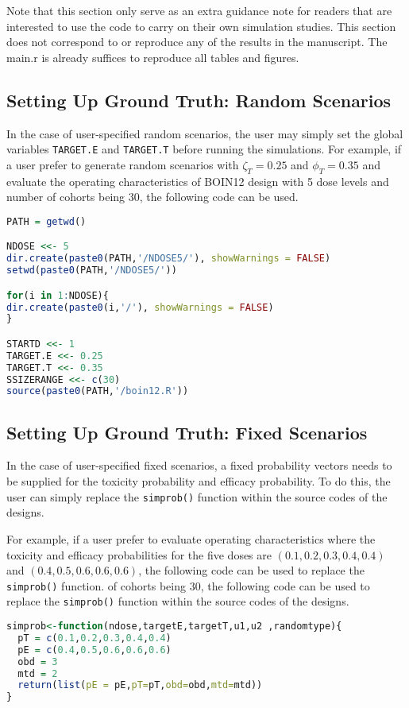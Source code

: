 \documentclass[notitlepage]{article}
\begin{document}
 Note that this section only serve as an extra guidance note for readers that are interested to use the code to carry on their own simulation studies. This section does not correspond to or reproduce any of the results in the manuscript. The main.r is already suffices to reproduce all tables and figures.

 \subsection{Setting Up Ground Truth: Random Scenarios}
 In the case of user-specified random scenarios, the user may simply set the global variables \texttt{TARGET.E} and  \texttt{TARGET.T} before running the simulations.
 For example, if a user prefer to generate random scenarios with $\zeta_T = 0.25$ and $\phi_T = 0.35$ and evaluate the operating characteristics of BOIN12 design with 5 dose levels and number of cohorts being 30, the following code can be used.
 \begin{lstlisting}[language=R]
PATH = getwd()

NDOSE <<- 5
dir.create(paste0(PATH,'/NDOSE5/'), showWarnings = FALSE)
setwd(paste0(PATH,'/NDOSE5/'))

for(i in 1:NDOSE){
dir.create(paste0(i,'/'), showWarnings = FALSE)
}

STARTD <<- 1
TARGET.E <<- 0.25
TARGET.T <<- 0.35
SSIZERANGE <<- c(30)
source(paste0(PATH,'/boin12.R'))
\end{lstlisting}

 \subsection{Setting Up Ground Truth: Fixed Scenarios}
 In the case of user-specified fixed scenarios, a fixed probability vectors needs to be supplied for the toxicity probability and efficacy probability. To do this, the user can simply replace the \texttt{simprob()} function within the source codes of the designs.

 For example, if a user prefer to evaluate operating characteristics  where the toxicity and efficacy probabilities for the five doses are $(0.1,0.2,0.3,0.4,0.4)$ and $(0.4,0.5,0.6,0.6,0.6)$, the following code can be used to replace the \texttt{simprob()} function.
 of cohorts being 30, the following code can be used to  replace the \texttt{simprob()} function within the source codes of the designs.
 \begin{lstlisting}[language=R]
simprob<-function(ndose,targetE,targetT,u1,u2 ,randomtype){
  pT = c(0.1,0.2,0.3,0.4,0.4)
  pE = c(0.4,0.5,0.6,0.6,0.6)
  obd = 3
  mtd = 2
  return(list(pE = pE,pT=pT,obd=obd,mtd=mtd))
}
\end{lstlisting}
\end{document}

